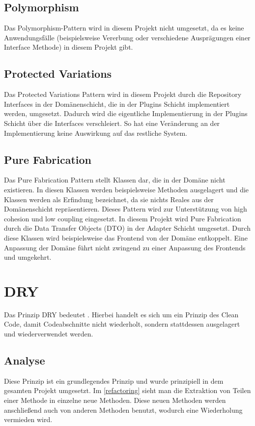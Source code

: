     \subsection{Polymorphism}
    Das Polymorphism-Pattern wird in diesem Projekt nicht umgesetzt, da es keine Anwendungsfälle (beispielsweise Vererbung oder verschiedene Ausprägungen einer Interface Methode) in diesem Projekt gibt.
    
    \subsection{Protected Variations}
    Das Protected Variations Pattern wird in diesem Projekt durch die Repository Interfaces in der Domänenschicht, die in der Plugins Schicht implementiert werden, umgesetzt. Dadurch wird die eigentliche Implementierung in der Plugins Schicht über die Interfaces verschleiert. So hat eine Veränderung an der Implementierung keine Auswirkung auf das restliche System.
    
    \subsection{Pure Fabrication}
    Das Pure Fabrication Pattern stellt Klassen dar, die in der Domäne nicht existieren. In diesen Klassen werden beispielsweise Methoden ausgelagert und die Klassen werden als Erfindung bezeichnet, da sie nichts Reales aus der Domänenschicht repräsentieren. Dieses Pattern wird zur Unterstützung von high cohesion und low coupling eingesetzt. In diesem Projekt wird Pure Fabrication durch die Data Transfer Objects (DTO) in der Adapter Schicht umgesetzt. Durch diese Klassen wird beispielsweise das Frontend von der Domäne entkoppelt. Eine Anpassung der Domäne führt nicht zwingend zu einer Anpassung des Frontends und umgekehrt.

\section{DRY}
Das Prinzip DRY bedeutet . Hierbei handelt es sich um ein Prinzip des Clean Code, damit Codeabschnitte nicht wiederholt, sondern stattdessen ausgelagert und wiederverwendet werden.

    \subsection{Analyse}
    Diese Prinzip ist ein grundlegendes Prinzip und wurde prinzipiell in dem gesamten Projekt umgesetzt. Im \cref{refactoring} sieht man die Extraktion von Teilen einer Methode in einzelne neue Methoden. Diese neuen Methoden werden anschließend auch von anderen Methoden benutzt, wodurch eine Wiederholung vermieden wird.
    

